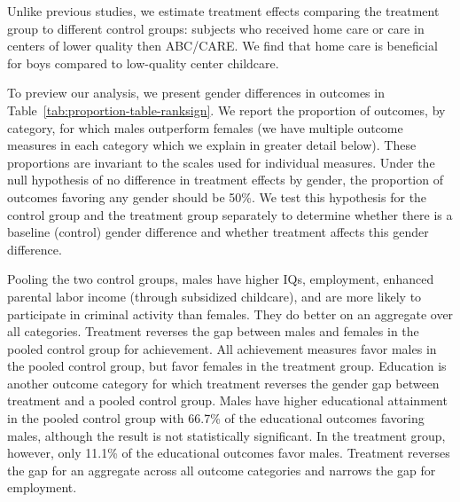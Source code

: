 Unlike previous studies, we estimate treatment effects comparing the treatment group to different control groups: subjects who received home care or care in centers of lower quality then ABC/CARE. We find that home care is beneficial for boys compared to low-quality center childcare.

To preview our analysis, we present gender differences in outcomes in Table~\ref{tab:proportion-table-ranksign}. We report the proportion of outcomes, by category, for which males outperform females (we have multiple outcome measures in each category which we explain in greater detail below). These proportions are invariant to the scales used for individual measures. Under the null hypothesis of no difference in treatment effects by gender, the proportion of outcomes favoring any gender should be 50\%. We test this hypothesis for the control group and the treatment group separately to determine whether there is a baseline (control) gender difference and whether treatment affects this gender difference.

Pooling the two control groups, males have higher IQs, employment, enhanced parental labor income (through subsidized childcare), and are more likely to participate in criminal activity than females. They do better on an aggregate over all categories. Treatment reverses the gap between males and females in the pooled control group for achievement. All achievement measures favor males in the pooled control group, but favor females in the treatment group. Education is another outcome category for which treatment reverses the gender gap between treatment and a pooled control group. Males have higher educational attainment in the pooled control group with 66.7\% of the educational outcomes favoring males, although the result is not statistically significant. In the treatment group, however, only 11.1\% of the educational outcomes favor males. Treatment reverses the gap for an aggregate across all outcome categories and narrows the gap for employment.

